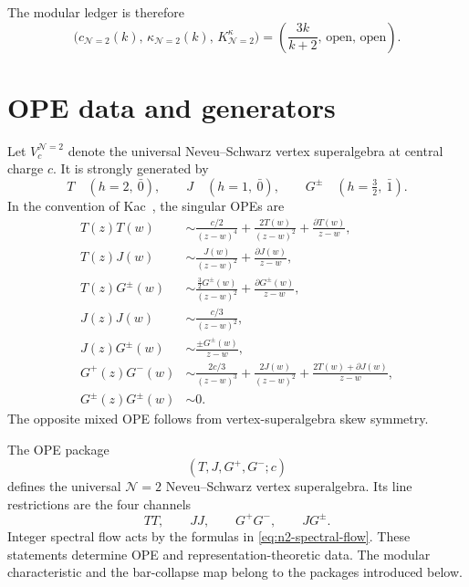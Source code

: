 The modular ledger is therefore
\begin{equation}\label{eq:n2-triple}
 \bigl(c_{\mathcal N=2}(k),\,\kappa_{\mathcal N=2}(k),\,
 K^\kappa_{\mathcal N=2}\bigr)
 =\left(\frac{3k}{k+2},\,\text{open},\,\text{open}\right).
\end{equation}

\section{OPE data and generators}

Let $V_c^{\mathcal N=2}$ denote the universal Neveu--Schwarz vertex
superalgebra at central charge $c$.  It is strongly generated by
\begin{equation}\label{eq:n2-generators}
 T\quad(h=2,\ \bar0),\qquad
 J\quad(h=1,\ \bar0),\qquad
 G^\pm\quad(h=\tfrac32,\ \bar1).
\end{equation}
In the convention of Kac~\cite{Kac98}, the singular OPEs are
\begin{align}
T(z)T(w)&\sim \frac{c/2}{(z-w)^4}
 +\frac{2T(w)}{(z-w)^2}+\frac{\partial T(w)}{z-w},
\label{eq:n2-ope-TT}\\
T(z)J(w)&\sim \frac{J(w)}{(z-w)^2}+\frac{\partial J(w)}{z-w},
\label{eq:n2-ope-TJ}\\
T(z)G^\pm(w)&\sim \frac{\frac32G^\pm(w)}{(z-w)^2}
 +\frac{\partial G^\pm(w)}{z-w},
\label{eq:n2-ope-TG}\\
J(z)J(w)&\sim \frac{c/3}{(z-w)^2},
\label{eq:n2-ope-JJ}\\
J(z)G^\pm(w)&\sim \frac{\pm G^\pm(w)}{z-w},
\label{eq:n2-ope-JG}\\
G^+(z)G^-(w)&\sim \frac{2c/3}{(z-w)^3}
 +\frac{2J(w)}{(z-w)^2}
 +\frac{2T(w)+\partial J(w)}{z-w},
\label{eq:n2-ope-GG}\\
G^\pm(z)G^\pm(w)&\sim 0.
\label{eq:n2-ope-self}
\end{align}
The opposite mixed OPE follows from vertex-superalgebra skew symmetry.

\begin{proposition}[$\mathcal N=2$ standard-family ledger;
\ClaimStatusProvedElsewhere]
\label{prop:n2-standard-family-ledger}
The OPE package
\begin{equation}\label{eq:n2-ledger-ope-package}
 (T,J,G^+,G^-;c)
\end{equation}
defines the universal $\mathcal N=2$ Neveu--Schwarz vertex
superalgebra.  Its line restrictions are the four channels
\begin{equation}\label{eq:n2-ledger-shadow-channels}
 T\!T,\qquad J\!J,\qquad G^+G^-,\qquad JG^\pm.
\end{equation}
Integer spectral flow acts by the formulas in
\eqref{eq:n2-spectral-flow}.  These statements determine OPE and
representation-theoretic data.  The modular characteristic and the
bar-collapse map belong to the packages introduced below.
\end{proposition}

